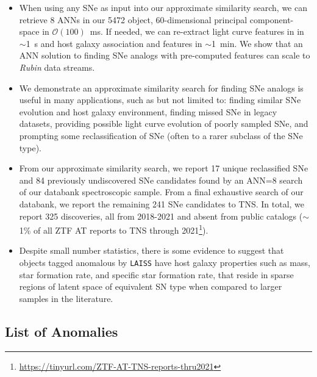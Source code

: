 \documentclass[twocolumn]{aastex63}
\newcommand{\laiss}{\texttt{LAISS}}
\begin{document}
\begin{itemize}
    \item When using any SNe as input into our approximate similarity search, we can retrieve 8 ANNs in our 5472 object, 60-dimensional principal component-space in $\mathcal{O}(100)$~ms. If needed, we can re-extract light curve features in in $\sim$1~s and host galaxy association and features in $\sim$1~min. We show that an ANN solution to finding SNe analogs with pre-computed features can scale to \textit{Rubin} data streams.  
    \item We demonstrate an approximate similarity search for finding SNe analogs is useful in many applications, such as but not limited to: finding similar SNe evolution and host galaxy environment, finding missed SNe in legacy datasets, providing possible light curve evolution of poorly sampled SNe, and prompting some reclassification of SNe (often to a rarer subclass of the SNe type).
    \item From our approximate similarity search, we report 17 unique reclassified SNe and 84 previously undiscovered SNe candidates found by an ANN=8 search of our databank spectroscopic sample. From a final exhaustive search of our databank, we report the remaining 241 SNe candidates to TNS. In total, we report 325 discoveries, all from 2018-2021 and absent from public catalogs ($\sim$1\% of all ZTF AT reports to TNS through 2021\footnote{\url{https://tinyurl.com/ZTF-AT-TNS-reports-thru2021}}).
    \item Despite small number statistics, there is some evidence to suggest that objects tagged anomalous by \laiss{} have host galaxy properties such as mass, star formation rate, and specific star formation rate, that reside in sparse regions of latent space of equivalent SN type when compared to larger samples in the literature. 
\end{itemize}


\subsection{List of Anomalies}
\label{subsec:list_of_anomalies}
\end{document}
